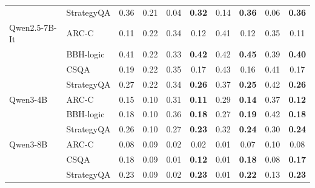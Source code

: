 \begin{table}[H]
\begin{tabular}{ll cc cc cc cc}
 & StrategyQA & 0.36 & 0.21 & 0.04 & \textbf{0.32} & 0.14 & \textbf{0.36} & 0.06 & \textbf{0.36} \\
\addlinespace
Qwen2.5-7B-It & ARC-C & 0.11 & 0.22 & 0.34 & 0.12 & 0.41 & 0.12 & 0.35 & 0.11 \\
 & BBH-logic & 0.41 & 0.22 & 0.33 & \textbf{0.42} & 0.42 & \textbf{0.45} & 0.39 & \textbf{0.40} \\
 & CSQA & 0.19 & 0.22 & 0.35 & 0.17 & 0.43 & 0.16 & 0.41 & 0.17 \\
 & StrategyQA & 0.27 & 0.22 & 0.34 & \textbf{0.26} & 0.37 & \textbf{0.25} & 0.42 & \textbf{0.26} \\
\addlinespace
Qwen3-4B & ARC-C & 0.15 & 0.10 & 0.31 & \textbf{0.11} & 0.29 & \textbf{0.14} & 0.37 & \textbf{0.12} \\
 & BBH-logic & 0.18 & 0.10 & 0.36 & \textbf{0.18} & 0.27 & \textbf{0.19} & 0.42 & \textbf{0.18} \\
 & StrategyQA & 0.26 & 0.10 & 0.27 & \textbf{0.23} & 0.32 & \textbf{0.24} & 0.30 & \textbf{0.24} \\
\addlinespace
Qwen3-8B & ARC-C & 0.08 & 0.09 & 0.02 & 0.02 & 0.01 & 0.07 & 0.10 & 0.08 \\
 & CSQA & 0.18 & 0.09 & 0.01 & \textbf{0.12} & 0.01 & \textbf{0.18} & 0.08 & \textbf{0.17} \\
 & StrategyQA & 0.23 & 0.09 & 0.02 & \textbf{0.23} & 0.01 & \textbf{0.22} & 0.13 & \textbf{0.23} \\
\bottomrule
\end{tabular}
\end{table}
